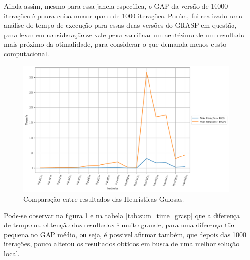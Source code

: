 \documentclass[a4paper, 12pt]{article}
\begin{document}
Ainda assim, mesmo para essa janela específica, o GAP da versão de 10000 iterações é pouca coisa menor que o de 1000 iterações.
Porém, foi realizado uma análise do tempo de execução para essas duas versões do GRASP em questão, para levar
em consideração se vale pena sacrificar um centésimo de um resultado mais próximo da otimalidade, para 
considerar o que demanda menos custo computacional.



\newpage
\begin{figure}[h]
    \centering
    \includegraphics[width=0.8\linewidth]{../imgs/grasp_compare_1kvs10k.pdf}
    \caption{Comparação entre resultados das Heurísticas Gulosas.}
    \label{grasp_compare_1kvs10k}
\end{figure}

Pode-se observar na figura \ref{grasp_compare_1kvs10k} e na tabela \ref{tab:sum_time_grasp} que a diferença 
de tempo na obtenção dos resultados é muito grande, para uma diferença tão pequena no GAP médio, ou seja, é possivel
afirmar também, que depois das 1000 iterações, pouco alterou os resultados obtidos em busca de uma 
melhor solução local. 
\end{document}
